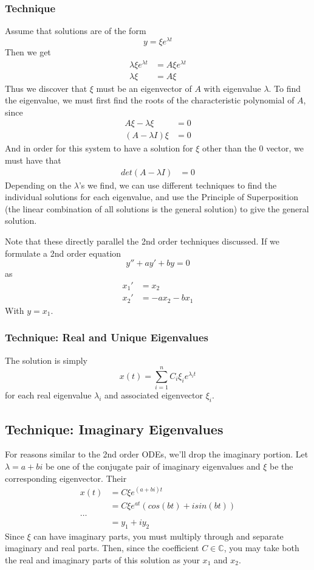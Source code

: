 \documentclass[11pt]{article}
\begin{document}
\subsubsection{Technique}
Assume that solutions are of the form
\[ y = \xi e^{\lambda t} \]
Then we get
\begin{align*}
    \lambda \xi e^{\lambda t} &= A \xi e^{\lambda t} \\
    \lambda \xi &= A \xi  
\end{align*}
Thus we discover that $\xi$ must be an eigenvector of $A$ with eigenvalue $\lambda$. To find the
eigenvalue, we must first find the roots of the characteristic polynomial of $A$, since
\begin{align*}
    A \xi - \lambda \xi &= 0 \\
    (A - \lambda I) \xi &= 0 
\end{align*}
And in order for this system to have a solution for $\xi$ other than the 0 vector, we must have that
\begin{align*}
    det(A - \lambda I) &= 0 
\end{align*}
Depending on the $\lambda$'s we find, we can use different techniques to find the individual solutions 
for each eigenvalue, and use the Principle of Superposition (the linear combination of all solutions is
the general solution) to give the general solution.

Note that these directly parallel the 2nd order techniques discussed. If we formulate a 2nd order 
equation
\begin{equation*}
    y'' + ay' + by = 0
\end{equation*}
as 
\begin{align*}
    x_1' &= x_2 \\
    x_2' &= -ax_2 - bx_1
\end{align*}
With $y = x_1$.
\subsubsection{Technique: Real and Unique Eigenvalues}
The solution is simply
\[ x(t) = \sum_{i = 1}^n C_i \xi_i e^{\lambda_i t}  \]
for each real eigenvalue $\lambda_i$ and associated eigenvector $\xi_i$.
\subsection{Technique: Imaginary Eigenvalues}
For reasons similar to the 2nd order ODEs, we'll drop the imaginary portion. Let $\lambda = a + bi$
be one of the conjugate pair of imaginary eigenvalues and $\xi$ be the corresponding eigenvector. Their 
\begin{align*}
    x(t) &= C\xi e^{(a + bi)t} \\
         &= C\xi e^{at} (cos(bt) + isin(bt)) \\
        \dots \\
         &= y_1 + iy_2 
\end{align*}
Since $\xi$ can have imaginary parts, you must multiply through and separate imaginary and real
parts. Then, since the coefficient $C \in \mathbb{C}$, you may take both the real and imaginary parts
of this solution as your $x_1$ and $x_2$. 
\end{document}

